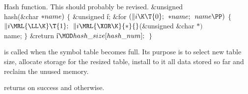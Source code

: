 Hash function. This should probably be revised.
\Y\B\&{unsigned} \\{hash}(\&{char} ${}{*}\\{name}){}$\1\1\2\2\6
${}\{{}$\1\6
\&{unsigned} \|i;\7
\&{for} ${}(\|i\K\T{0};{}$ ${}{*}\\{name};{}$ ${}\\{name}\PP){}$\5
${}\{{}$\1\6
${}\|i\MRL{{\LL}{\K}}\T{1};{}$\6
${}\|i\MRL{{\XOR}{\K}}{*}{}$(\&{unsigned} \&{char} ${}{*}){}$ \\{name};\6
\4${}\}{}$\2\6
\&{return} \|i${}\MOD\\{hash\_size}[\\{hash\_num}];{}$\6
\4${}\}{}$\2\par
\fi

 is called when the symbol table becomes full. Its purpose
is
to select new table size, allocate storage for the resized table, install
to it all data stored so far and reclaim the unused memory.

 returns  on success and  otherwise.

